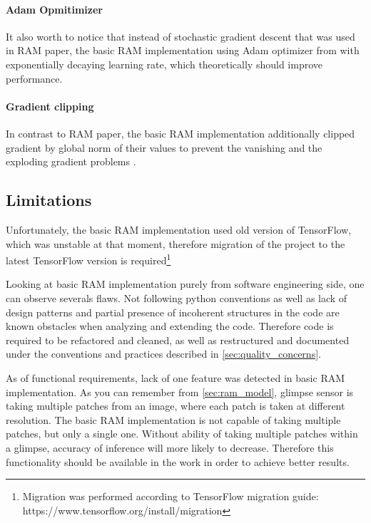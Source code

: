 {\paragraph{Adam Opmitimizer} It also worth to notice that instead of stochastic
gradient descent that was used in RAM paper, the basic RAM implementation using Adam optimizer
from \cite{DBLP:journals/corr/KingmaB14} with exponentially decaying learning rate,
which theoretically should improve performance. \cite{DBLP:journals/corr/KingmaB14}


\paragraph{Gradient clipping} In contrast to RAM paper, the basic RAM implementation
additionally clipped gradient by global norm of their values to prevent the vanishing
and the exploding gradient problems \cite{Pascanu2012}.


\subsection{Limitations}
Unfortunately, the basic RAM implementation used old version of TensorFlow,
which was unstable at that moment, therefore migration of the project
to the latest TensorFlow version is required\footnote{
	Migration was performed according to TensorFlow migration
	guide: https://www.tensorflow.org/install/migration
}

Looking at basic RAM implementation purely from software engineering side,
one can observe severals flaws. Not following python conventions as well
as lack of design patterns and partial presence of incoherent structures in the code
are known obstacles when analyzing and extending the code.
Therefore code is required to be refactored and cleaned,
as well as restructured and documented under the conventions and
practices described in \autoref{sec:quality_concerns}.


As of functional requirements, lack of one feature was detected in basic RAM implementation.
As you can remember from \autoref{sec:ram_model}, glimpse sensor is taking
multiple patches from an image, where each patch is taken at different resolution.
The basic RAM implementation is not capable of taking multiple patches,
but only a single one. Without ability of taking multiple patches within a glimpse,
accuracy of inference will more likely to decrease. Therefore this functionality
should be available in the work in order to achieve better results.

}
